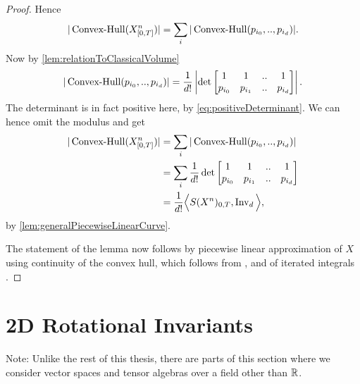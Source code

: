 \begin{proof}
  Hence
  \begin{align*}
    |\operatorname{Convex-Hull}( X^n_{[0,T]} )|
    =
    \sum_i |\operatorname{Convex-Hull}( p_{i_0}, .., p_{i_d} )|.
  \end{align*}
  Now by \autoref{lem:relationToClassicalVolume}
  \begin{align*}
    |\operatorname{Convex-Hull}( p_{i_0}, .., p_{i_d} )|
    =
    \frac{1}{d!}
    \left|
    \det\left[
      \begin{matrix}
        1 & 1 & .. & 1 \\
        p_{i_0} & p_{i_1} & .. & p_{i_d}
      \end{matrix}
    \right]
    \right|.
  \end{align*}
  The determinant is in fact positive here, by \eqref{eq:positiveDeterminant}.
  We can hence omit the modulus and get
  \begin{align*}
    |\operatorname{Convex-Hull}( X^n_{[0,T]} )|
    &=
    \sum_i |\operatorname{Convex-Hull}( p_{i_0}, .., p_{i_d} )| \\
    &=
    \sum_i \frac{1}{d!}
    \det\left[
      \begin{matrix}
        1 & 1 & .. & 1 \\
        p_{i_0} & p_{i_1} & .. & p_{i_d}
      \end{matrix}
    \right] \\
    &=
    \frac{1}{d!} \Big\langle S(X^n)_{0,T}, \operatorname{Inv}_{d} \Big\rangle,
  \end{align*}
  by \autoref{lem:generalPiecewiseLinearCurve}.

  The statement of the lemma now follows by piecewise linear approximation of $X$
  using continuity of the convex hull, which follows from \cite[Lemma 3.2]{HullCts},
  and of iterated integrals \cite[Proposition 1.28, Proposition 2.7]{FrizVictoir}.
\end{proof}

\section{2D Rotational Invariants}
\label{sec:rotinv2d}
Note: Unlike the rest of this thesis, there are parts of this section where we consider vector spaces and tensor algebras over a field other than $\mathbb{R}$.

